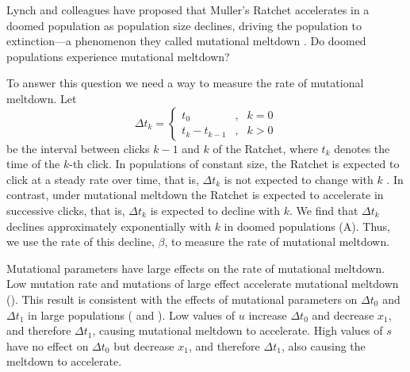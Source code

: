 \documentclass[9pt,lineno]{elife}
\begin{document}
Lynch and colleagues have proposed that Muller's Ratchet accelerates in a doomed population as population size declines, driving the population to extinction---a phenomenon they called mutational meltdown \citep{Lynch_MUTATION_1990, lyn93, Gabriel_MULLER_1993}.  
Do doomed populations experience mutational meltdown?

To answer this question we need a way to measure the rate of mutational meltdown.  Let 
%
\begin{equation}
\Delta t_k = \left\{\begin{array}{lll}
%
    t_0               & , & k = 0       \\ [4pt]
	t_k - t_{k-1}     & , & k > 0
    \end{array}
%
\right. 
\label{eq:deltat}
\end{equation}
%
be the interval between clicks $k-1$ and $k$ of the Ratchet, where $t_k$ denotes the time of the $k$-th click.  
%
In populations of constant size, 
the Ratchet is expected to click at a steady rate over time, that is,
$\Delta t_k$ is not expected to change with $k$ \citep{Haigh_The_1978, Gordo_On_2000, gor00b}.  
%
In contrast, under mutational meltdown
the Ratchet is expected to accelerate in successive clicks, that is,
$\Delta t_k$ is expected to decline with $k$.
%
We find that $\Delta t_k$ declines approximately exponentially with $k$ in doomed populations (A).  Thus, we use the rate of this decline, $\beta$, to measure the rate of mutational meltdown.

Mutational parameters have large effects on the rate of mutational meltdown.  Low mutation rate and mutations of large effect accelerate mutational meltdown ().  This result is consistent with the effects of mutational parameters on $\Delta t_0$ and $\Delta t_1$ in large populations ( and ).  
%
Low values of $u$ increase $\Delta t_0$  and decrease $x_1$, and therefore $\Delta t_1$, causing mutational meltdown to accelerate.  
%
High values of $s$ have no effect on $\Delta t_0$ but decrease $x_1$, and therefore $\Delta t_1$, also causing the meltdown to accelerate.
\end{document}
